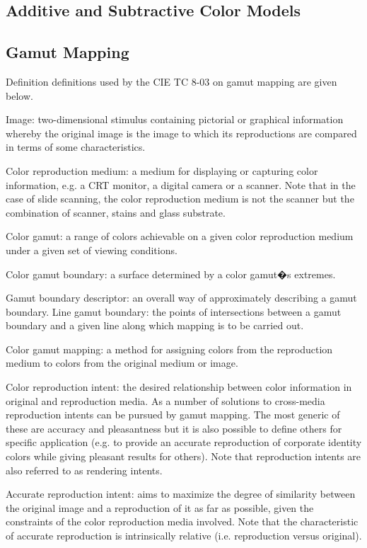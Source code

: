 \documentclass{amsart}
\theoremstyle{definition}
\theoremstyle{remark}
\numberwithin{equation}{section}
\begin{document}
\subsection{Additive and Subtractive Color Models}

\subsection{Gamut Mapping}
Definition definitions used by the CIE TC 8-03 on gamut mapping are given below.

Image: two-dimensional stimulus containing pictorial or graphical information whereby the original
image is the image to which its reproductions are compared in terms of some characteristics.

Color reproduction medium: a medium for displaying or capturing color information, e.g. a CRT
monitor, a digital camera or a scanner. Note that in the case of slide scanning, the color reproduction
medium is not the scanner but the combination of scanner, stains and glass substrate.

Color gamut: a range of colors achievable on a given color reproduction medium under a given set of viewing conditions.

Color gamut boundary: a surface determined by a color gamut�s extremes.

Gamut boundary descriptor: an overall way of approximately describing a gamut boundary.
Line gamut boundary: the points of intersections between a gamut boundary and a given line along which mapping is to be carried out.

Color gamut mapping: a method for assigning colors from the reproduction medium to colors from the
original medium or image.

Color reproduction intent: the desired relationship between color information in original and
reproduction media. As a number of solutions to cross-media reproduction intents can be pursued by
gamut mapping. The most generic of these are accuracy and pleasantness but it is also possible to
define others for specific application (e.g. to provide an accurate reproduction of corporate
identity colors while giving pleasant results for others). Note that reproduction intents are also
referred to as rendering intents.

Accurate reproduction intent: aims to maximize the degree of similarity between the original image
and a reproduction of it as far as possible, given the constraints of the color reproduction media
involved. Note that the characteristic of accurate reproduction is intrinsically relative (i.e.
reproduction versus original).
\end{document}
